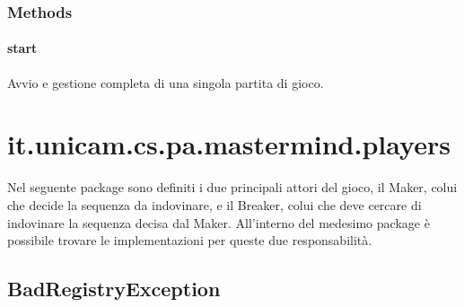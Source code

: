 \documentclass[letterpaper,10pt,italian]{sphinxmanual}
\begin{document}
\subsubsection{Methods}
\label{\detokenize{source/it/unicam/cs/pa/mastermind/gamecore/SingleMatch:methods}}

\paragraph{start}
\label{\detokenize{source/it/unicam/cs/pa/mastermind/gamecore/SingleMatch:start}}

\begin{fulllineitems}
\label{\detokenize{source/it/unicam/cs/pa/mastermind/gamecore/SingleMatch:it.unicam.cs.pa.mastermind.gamecore.SingleMatch.start()}}
Avvio e gestione completa di una singola partita di gioco.

\end{fulllineitems}



\section{it.unicam.cs.pa.mastermind.players}
\label{\detokenize{source/it/unicam/cs/pa/mastermind/players/package-index:it-unicam-cs-pa-mastermind-players}}\label{\detokenize{source/it/unicam/cs/pa/mastermind/players/package-index::doc}}
Nel seguente package sono definiti i due principali attori del gioco, il Maker, colui che decide la sequenza da indovinare, e il Breaker, colui che deve cercare di indovinare la sequenza decisa dal Maker. All’interno del medesimo package è possibile trovare le implementazioni per queste due responsabilità.

\label{\detokenize{source/it/unicam/cs/pa/mastermind/players/package-index:package-it.unicam.cs.pa.mastermind.players}}

\subsection{BadRegistryException}
\label{\detokenize{source/it/unicam/cs/pa/mastermind/players/BadRegistryException:badregistryexception}}\label{\detokenize{source/it/unicam/cs/pa/mastermind/players/BadRegistryException::doc}}
\end{document}

